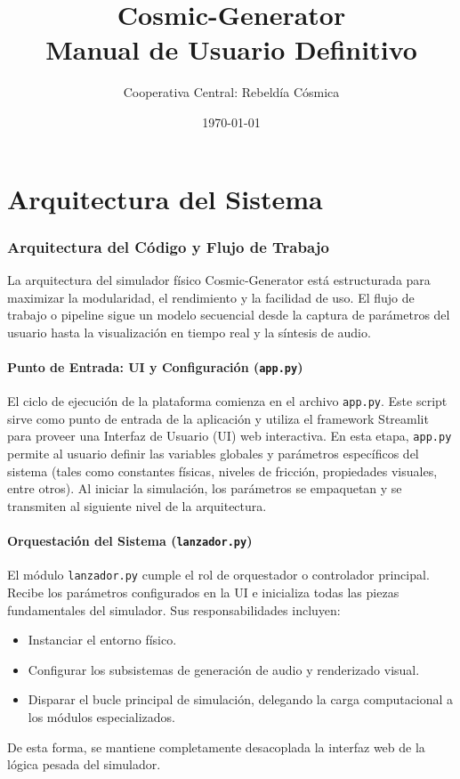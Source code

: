 \documentclass[12pt]{book}
\title{\Huge \textbf{Cosmic-Generator} \\ \Large Manual de Usuario Definitivo}
\author{Cooperativa Central: Rebeldía Cósmica}
\date{\today}
\begin{document}
\maketitle
\tableofcontents
\newpage
\part{Arquitectura del Sistema}

\section{Arquitectura del Código y Flujo de Trabajo}

La arquitectura del simulador físico Cosmic-Generator está estructurada para maximizar la modularidad, el rendimiento y la facilidad de uso. El flujo de trabajo o pipeline sigue un modelo secuencial desde la captura de parámetros del usuario hasta la visualización en tiempo real y la síntesis de audio.

\subsection{Punto de Entrada: UI y Configuración (\texttt{app.py})}
El ciclo de ejecución de la plataforma comienza en el archivo \texttt{app.py}. Este script sirve como punto de entrada de la aplicación y utiliza el framework Streamlit para proveer una Interfaz de Usuario (UI) web interactiva. En esta etapa, \texttt{app.py} permite al usuario definir las variables globales y parámetros específicos del sistema (tales como constantes físicas, niveles de fricción, propiedades visuales, entre otros). Al iniciar la simulación, los parámetros se empaquetan y se transmiten al siguiente nivel de la arquitectura.

\subsection{Orquestación del Sistema (\texttt{lanzador.py})}
El módulo \texttt{lanzador.py} cumple el rol de orquestador o controlador principal. Recibe los parámetros configurados en la UI e inicializa todas las piezas fundamentales del simulador. Sus responsabilidades incluyen:
\begin{itemize}
    \item Instanciar el entorno físico.
    \item Configurar los subsistemas de generación de audio y renderizado visual.
    \item Disparar el bucle principal de simulación, delegando la carga computacional a los módulos especializados.
\end{itemize}
De esta forma, se mantiene completamente desacoplada la interfaz web de la lógica pesada del simulador.
\end{document}
